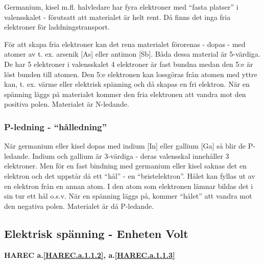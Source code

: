 Germanium, kisel m.fl. halvledare har fyra elektroner med ``fasta platser'' i
valensskalet - förutsatt att materialet är helt rent. Då finns det inga fria
elektroner för laddningstransport.

För att skapa fria elektroner kan det rena materialet förorenas - dopas - med
atomer av t. ex. arsenik [As] eller antimon [Sb]. Båda dessa material är
5-värdiga. De har 5 elektroner i valensskalet 4 elektroner är fast bundna medan
den 5:e är löst bunden till atomen. Den 5:e elektronen kan lossgöras från
atomen med yttre kan, t. ex. värme eller elektrisk spänning och då skapas en
fri elektron. När en spänning läggs på materialet kommer den fria elektronen
att vandra mot den positiva polen. Materialet är N-ledande.

\subsubsection{P-ledning - ``hålledning''}
När germanium eller kisel dopas med indium [In] eller gallium [Ga] så blir de
P-ledande. Indium och gallium är 3-värdiga - deras valensskal innehåller 3
elektroner. Men för en fast bindning med germanium eller kisel saknas det en
elektron och det uppstår då ett ``hål'' - en ``bristelektron''. Hålet kan fyllas ut
av en elektron från en annan atom. I den atom som elektronen lämnar bildas det
i sin tur ett hål o.s.v. När en spänning läggs på, kommer ``hålet'' att vandra
mot den negativa polen. Materialet är då P-ledande.

\subsection{Elektrisk spänning - Enheten Volt}
\textbf{HAREC a.\ref{HAREC.a.1.1.2}\label{myHAREC.a.1.1.2b}, a.\ref{HAREC.a.1.1.3}\label{myHAREC.a.1.1.3b}}

